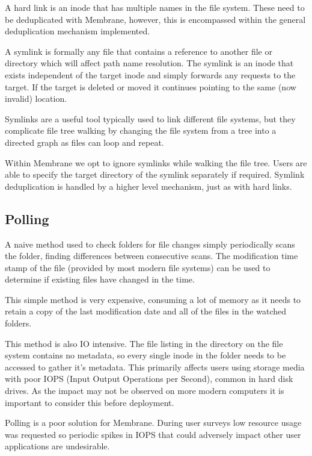 \documentclass[11pt, a4paper, twoside]{report}
\begin{document}
A hard link is an inode that has multiple names in the file system. These need to be deduplicated with Membrane, however, this is encompassed within the general deduplication mechanism implemented.

A symlink is formally any file that contains a reference to another file or directory which will affect path name resolution. The symlink is an inode that exists independent of the target inode and simply forwards any requests to the target. If the target is deleted or moved it continues pointing to the same (now invalid) location. \citep{yue2011unix}

Symlinks are a useful tool typically used to link different file systems, but they complicate file tree walking by changing the file system from a tree into a directed graph as files can loop and repeat.

Within Membrane we opt to ignore symlinks while walking the file tree. Users are able to specify the target directory of the symlink separately if required. Symlink deduplication is handled by a higher level mechanism, just as with hard links.

\subsection{Polling}

A naive method used to check folders for file changes simply periodically scans the folder, finding differences between consecutive scans. The modification time stamp of the file (provided by most modern file systems) can be used to determine if existing files have changed in the time.

This simple method is very expensive, consuming a lot of memory as it needs to retain a copy of the last modification date and all of the files in the watched folders.

This method is also IO intensive. The file listing in the directory on the file system contains no metadata, so every single inode in the folder needs to be accessed to gather it's metadata. This primarily affects users using storage media with poor IOPS (Input Output Operations per Second), common in hard disk drives. As the impact may not be observed on more modern computers it is important to consider this before deployment. \citep{mansurov2017storage}

Polling is a poor solution for Membrane. During user surveys low resource usage was requested so periodic spikes in IOPS that could adversely impact other user applications are undesirable.
\end{document}
